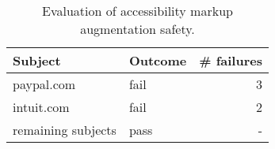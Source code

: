 \begin{table}[t]
\caption{Evaluation of accessibility markup augmentation safety.}
\label{table:rq2}
\centering
\begin{tabular}{llr}
\hline
\textbf{Subject}    & \textbf{Outcome} 		&\textbf{\# failures} \\ 
\hline
paypal.com        	& fail      			&		3             \\
intuit.com        	& fail      			&		2             \\
remaining subjects	& pass	  				& 		- 			  \\
\hline
\end{tabular}
\end{table}
